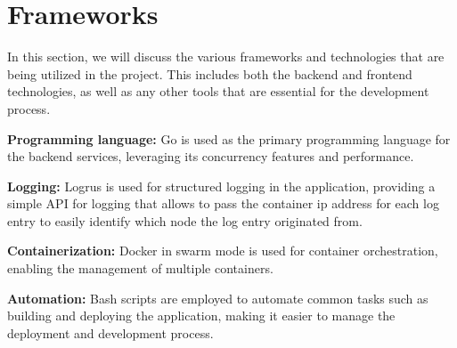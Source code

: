 
\section{Frameworks}
In this section, we will discuss the various frameworks and technologies that are being utilized in the project. This includes both the backend and frontend technologies, as well as any other tools that are essential for the development process.

\begin{list}{}
    \item \textbf{Programming language:} Go is used as the primary programming language for the backend services, leveraging its concurrency features and performance.
    \item \textbf{Logging:} Logrus is used for structured logging in the application, providing a simple API for logging that allows to pass the container ip address for each log entry to easily identify which node the log entry originated from.
    \item \textbf{Containerization:} Docker in swarm mode is used for container orchestration, enabling the management of multiple containers.
    \item \textbf{Automation:} Bash scripts are employed to automate common tasks such as building and deploying the application, making it easier to manage the deployment and development process.
\end{list}